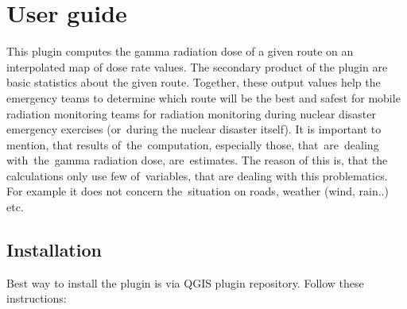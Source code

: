 \chapter{User guide} \label{User guide}
This plugin computes the gamma radiation dose of a given route on an
interpolated map of dose rate values. The secondary product of the
plugin are basic statistics about the given route. Together, these
output values help the emergency teams to determine which route will be
the best and safest for mobile radiation monitoring teams for radiation
monitoring during nuclear disaster emergency exercises (or~during the
nuclear disaster itself). It is important to mention, that results of~the~computation, especially
those, that~are~dealing with~the~gamma radiation dose, are~estimates.
The reason of this is, that the calculations only use few of~variables,
that are dealing with this problematics. For example it does not concern
the~situation on roads, weather (wind, rain..) etc.

\section{Installation}
Best way to install the plugin is via QGIS plugin repository.
Follow these instructions:

